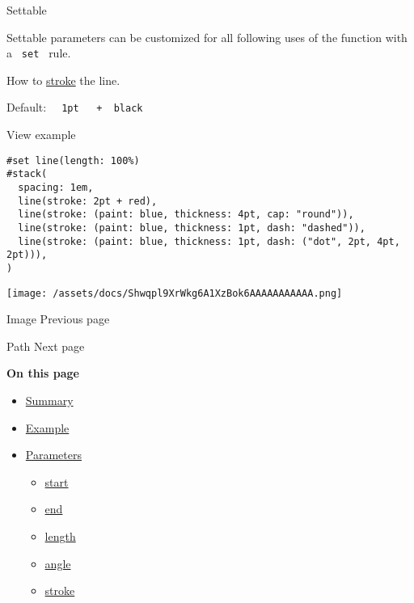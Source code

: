 {{ Settable }}

\label{parameters-stroke-settable-tooltip}
Settable parameters can be customized for all following uses of the
function with a \texttt{\ set\ } rule.

How to \href{/docs/reference/visualize/stroke/}{stroke} the line.

Default:
\texttt{\ }{\texttt{\ 1pt\ }}\texttt{\ }{\texttt{\ +\ }}\texttt{\ black\ }


View example

\begin{verbatim}
#set line(length: 100%)
#stack(
  spacing: 1em,
  line(stroke: 2pt + red),
  line(stroke: (paint: blue, thickness: 4pt, cap: "round")),
  line(stroke: (paint: blue, thickness: 1pt, dash: "dashed")),
  line(stroke: (paint: blue, thickness: 1pt, dash: ("dot", 2pt, 4pt, 2pt))),
)
\end{verbatim}

\texttt{[image: /assets/docs/Shwqpl9XrWkg6A1XzBok6AAAAAAAAAAA.png]}

\href{/docs/reference/visualize/image/}{\pandocbounded{}}

{ Image } { Previous page }

\href{/docs/reference/visualize/path/}{\pandocbounded{}}

{ Path } { Next page }

\textbf{On this page}

\begin{itemize}
\tightlist
\item
  \hyperref[summary]{Summary}
\item
  \hyperref[example]{Example}
\item
  \hyperref[parameters]{Parameters}

  \begin{itemize}
  \tightlist
  \item
    \hyperref[parameters-start]{start}
  \item
    \hyperref[parameters-end]{end}
  \item
    \hyperref[parameters-length]{length}
  \item
    \hyperref[parameters-angle]{angle}
  \item
    \hyperref[parameters-stroke]{stroke}
  \end{itemize}
\end{itemize}

